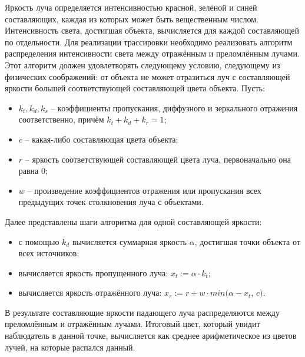 {    Яркость луча определяется интенсивностью красной, зелёной и синей составляющих,
    каждая из которых может быть вещественным числом.
    Интенсивность света, достигшая объекта, вычисляется для каждой составляющей
    по отдельности.
    Для реализации трассировки необходимо реализовать алгоритм распределения
    интенсивности света между отражённым и преломлённым лучами.
    Этот алгоритм должен удовлетворять следующему условию, следующему
    из физических соображений: от объекта не может отразиться луч с составляющей
    яркости большей соответствующей составляющей цвета объекта.
    Пусть:
    \begin{itemize}
        \item
            $k_t, k_d, k_s$ -- коэффициенты пропускания,
            диффузного и зеркального отражения соответственно,
            причём $k_t + k_d + k_r = 1$;
        \item $c$ -- какая-либо составляющая цвета объекта;
        \item
            $r$ -- яркость соответствующей составляющей цвета луча,
            первоначально она равна $0$;
        \item
            $w$ -- произведение коэффициентов отражения или пропускания
            всех предыдущих точек столкновения луча с объектами.
    \end{itemize}
    Далее представлены шаги алгоритма для одной составляющей яркости:
    \begin{itemize}
        \item
            с помощью $k_d$ вычисляется суммарная яркость $\alpha$,
            достигшая точки объекта от всех источников;
        \item вычисляется яркость пропущенного луча: $x_t := \alpha \cdot k_t$;
        \item
            вычисляется яркость отражённого луча:
            $x_r := r + w \cdot min(\alpha - x_t$, $c)$.
    \end{itemize}
    В результате составляющие яркости падающего луча распределяются
    между преломлённым и отражённым лучами.
    Итоговый цвет, который увидит наблюдатель в данной точке, вычисляется
    как среднее арифметическое из цветов лучей, на которые распался данный.
}